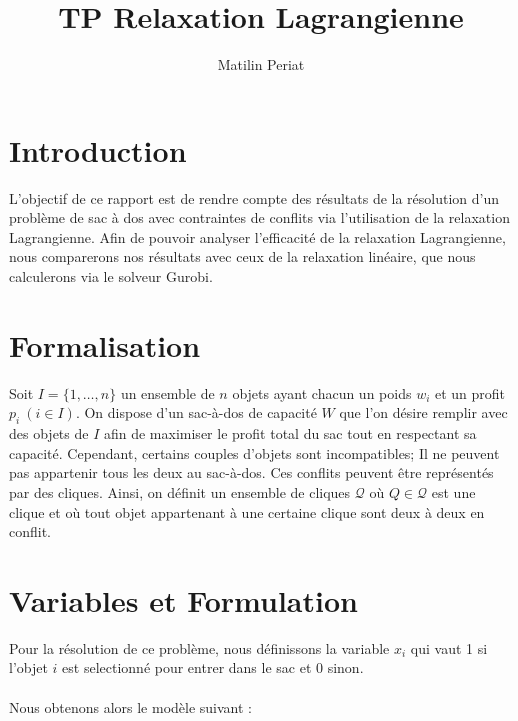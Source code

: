 \documentclass[french,nochapter,11pt]{rapportUB}
\author{ %
	Matilin Periat
}
\begin{document}
	
	\title{TP Relaxation Lagrangienne}
	
	\maketitle
	
	\begin{center}
		\tableofcontents %
		\clearpage
	\end{center}


	\section{Introduction}

	L'objectif de ce rapport est de rendre compte des résultats de la résolution d'un problème de sac à dos avec contraintes de conflits via l'utilisation de la relaxation Lagrangienne. Afin de pouvoir analyser l'efficacité de la relaxation Lagrangienne, nous comparerons nos résultats avec ceux de la relaxation linéaire, que nous calculerons via le solveur Gurobi. 
	
	\section{Formalisation}
	
	Soit $I = \{1,\dots,n\}$ un ensemble de $n$ objets ayant chacun un poids $w_i$ et un profit 
	$p_i ~(i \in I)$. On dispose d'un sac-à-dos de capacité $W$ que l'on désire remplir avec des objets 
	de $I$ afin de maximiser le profit total du sac tout en respectant sa capacité. 
	Cependant, certains couples d'objets sont incompatibles; Il ne peuvent pas appartenir tous les deux au 
	sac-à-dos. Ces conflits peuvent être représentés par des cliques. Ainsi, on définit un ensemble de cliques $\mathcal{Q}$
	où $Q\in \mathcal{Q}$ est une clique et où tout objet appartenant à une certaine clique sont deux à deux en conflit. 
	
	\section{Variables et Formulation}
	
	Pour la résolution de ce problème, nous définissons la variable $x_i$ qui vaut 1 si l'objet $i$ est selectionné pour entrer dans le sac et 0 sinon. \\ \\
	
	Nous obtenons alors le modèle suivant : \\
	
\end{document}
